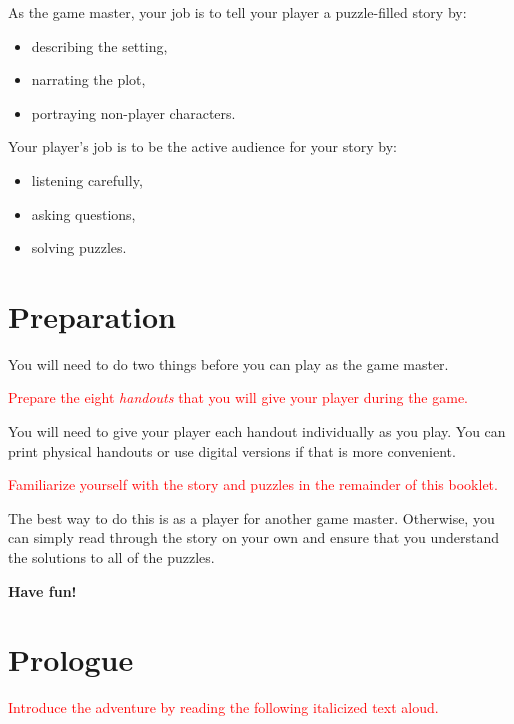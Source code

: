 \documentclass[a6paper, parskip=half, DIV=14, 12pt]{scrartcl}
\begin{document}
As the game master, your job is to tell your player a puzzle-filled story by:
\begin{itemize}[leftmargin=*]
\item describing the setting,
\item narrating the plot,
\item portraying non-player characters.
\end{itemize}

Your player's job is to be the active audience for your story by:
\begin{itemize}[leftmargin=*]
\item listening carefully,
\item asking questions,
\item solving puzzles.
\end{itemize}

\newpage

\section*{Preparation}
You will need to do two things before you can play as the game master.

\textcolor{Red}{Prepare the eight \emph{handouts} that you will give your player during the game.}

You will need to give your player each handout individually as you play. You can print physical handouts or use digital versions if that is more convenient.
%

\textcolor{Red}{Familiarize yourself with the story and puzzles in the remainder of this booklet.}

The best way to do this is as a player for another game master. Otherwise, you can simply read through the story on your own and ensure that you understand the solutions to all of the puzzles.

\textbf{Have fun!}
\newpage

\section*{Prologue}


\textcolor{Red}{Introduce the adventure by reading the following italicized text aloud.}
\end{document}
